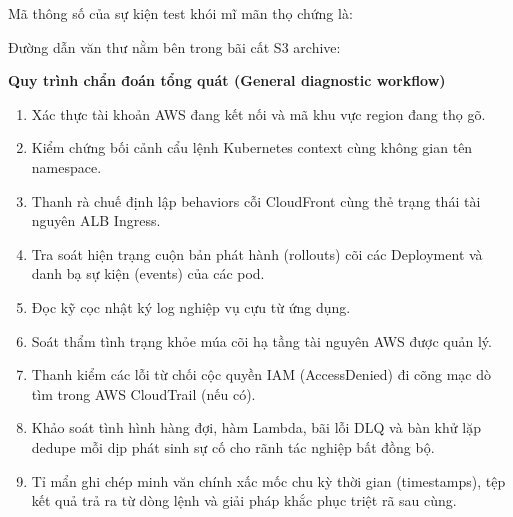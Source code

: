 \begin{Shaded}
\begin{Highlighting}[]
\FunctionTok{\{}
  \FunctionTok{:} \FunctionTok{,}
  \FunctionTok{:} \FunctionTok{\{}
    \FunctionTok{:} 
  \FunctionTok{\}}
\FunctionTok{\}}
\end{Highlighting}
\end{Shaded}

Mã thông số của sự kiện test khói mĩ mãn thọ chứng là:

\begin{Shaded}
\begin{Highlighting}[]
\end{Highlighting}
\end{Shaded}

Đường dẫn văn thư nằm bên trong bãi cất S3 archive:

\begin{Shaded}
\begin{Highlighting}[]
\end{Highlighting}
\end{Shaded}

\vspace{0.5em}\noindent\textbf{Quy trình chẩn đoán tổng quát (General diagnostic
workflow)}\par

\begin{enumerate}
\def\labelenumi{\arabic{enumi}.}
\tightlist
\item
  Xác thực tài khoản AWS đang kết nối và mã khu vực region đang thọ gõ.
\item
  Kiểm chứng bối cảnh cẩu lệnh Kubernetes context cùng không gian tên
  namespace.
\item
  Thanh rà chuế định lập behaviors cỗi CloudFront cùng thẻ trạng thái
  tài nguyên ALB Ingress.
\item
  Tra soát hiện trạng cuộn bản phát hành (rollouts) cõi các Deployment
  và danh bạ sự kiện (events) của các pod.
\item
  Đọc kỹ cọc nhật ký log nghiệp vụ cựu từ ứng dụng.
\item
  Soát thẩm tình trạng khỏe múa cõi hạ tầng tài nguyên AWS được quản lý.
\item
  Thanh kiểm các lỗi từ chối cộc quyền IAM (AccessDenied) đi cõng mạc dò
  tìm trong AWS CloudTrail (nếu có).
\item
  Khảo soát tình hình hàng đợi, hàm Lambda, bãi lỗi DLQ và bàn khử lặp
  dedupe mỗi dịp phát sinh sự cố cho rãnh tác nghiệp bất đồng bộ.
\item
  Tỉ mẩn ghi chép minh văn chính xấc mốc chu kỳ thời gian (timestamps),
  tệp kết quả trả ra từ dòng lệnh và giải pháp khắc phục triệt rã sau
  cùng.
\end{enumerate}

